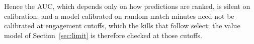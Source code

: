 Hence the AUC, which depends only on how predictions are ranked, is silent on calibration,
and a model calibrated on random match minutes need not be calibrated at engagement
cutoffs, which the kills that follow select; the value model of Section~\ref{sec:limit} is
therefore checked at those cutoffs.
